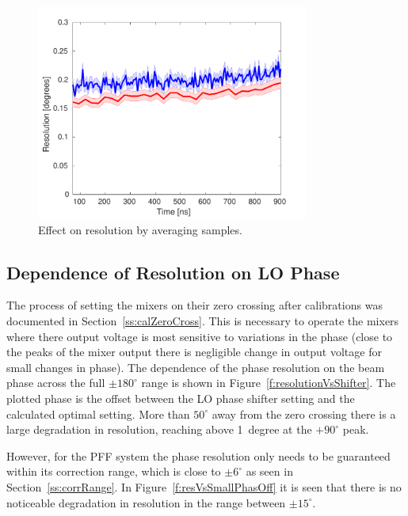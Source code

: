 \begin{figure}
  \centering
  \includegraphics[width=0.8\textwidth]{Figures/phaseMons/resolutionWithAveraging}
  \caption{Effect on resolution by averaging samples.}
  \label{f:resolutionWithAveraging}
\end{figure}


\subsection{Dependence of Resolution on LO Phase}
\label{ss:resVsShifter}

The process of setting the mixers on their zero crossing after calibrations was documented in Section~\ref{ss:calZeroCross}. This is necessary to operate the mixers where there output voltage is most sensitive to variations in the phase (close to the peaks of the mixer output there is negligible change in output voltage for small changes in phase). The dependence of the phase resolution on the beam phase across the full \(\pm180^\circ\) range is shown in Figure~\ref{f:resolutionVsShifter}. The plotted phase is the offset between the LO phase shifter setting and the calculated optimal setting. More than \(50^\circ\) away from the zero crossing there is a large degradation in resolution, reaching above 1~degree at the \(+90^\circ\) peak.

However, for the PFF system the phase resolution only needs to be guaranteed within its correction range, which is close to \(\pm6^\circ\) as seen in Section~\ref{ss:corrRange}. In Figure~\ref{f:resVsSmallPhasOff} it is seen that there is no noticeable degradation in resolution in the range between \(\pm15^\circ\).

